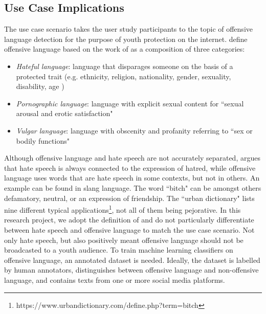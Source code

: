 \subsection{Use Case Implications}
The use case scenario takes the user study participants to the topic of offensive language detection for the purpose of youth protection on the internet. \cite{chen2012detecting} define offensive language based on the work of \cite{jay2008pragmatics} as a composition of three categories:
\begin{itemize}
	\item \textit{Hateful language}: language that disparages someone on the basis of a protected trait (e.g. ethnicity, religion, nationality, gender, sexuality, disability, age \cite{diakopoulos2016accountability})
	\item \textit{Pornographic language}: language with explicit sexual content for ``sexual arousal and erotic satisfaction" \cite{chen2012detecting}
	\item \textit{Vulgar language}: language with obscenity and profanity referring to ``sex or bodily functions" \cite{chen2012detecting}	
\end{itemize}
Although offensive language and hate speech are not accurately separated, \cite{davidson2017automated} argues that hate speech is always connected to the expression of hatred, while offensive language uses words that are hate speech in some contexts, but not in others. An example can be found in slang language. The word ``bitch" can be amongst others defamatory, neutral, or an expression of friendship. The ``urban dictionary" lists nine different typical applications\footnote{https://www.urbandictionary.com/define.php?term=bitch}, not all of them being pejorative. In this research project, we adopt the definition of \cite{chen2012detecting} and do not particularly differentiate between hate speech and offensive language to match the use case scenario. Not only hate speech, but also positively meant offensive language should not be broadcasted to a youth audience.\newline
To train machine learning classifiers on offensive language, an annotated dataset is needed. Ideally, the dataset is labelled by human annotators, distinguishes between offensive language and non-offensive language, and contains texts from one or more social media platforms.

